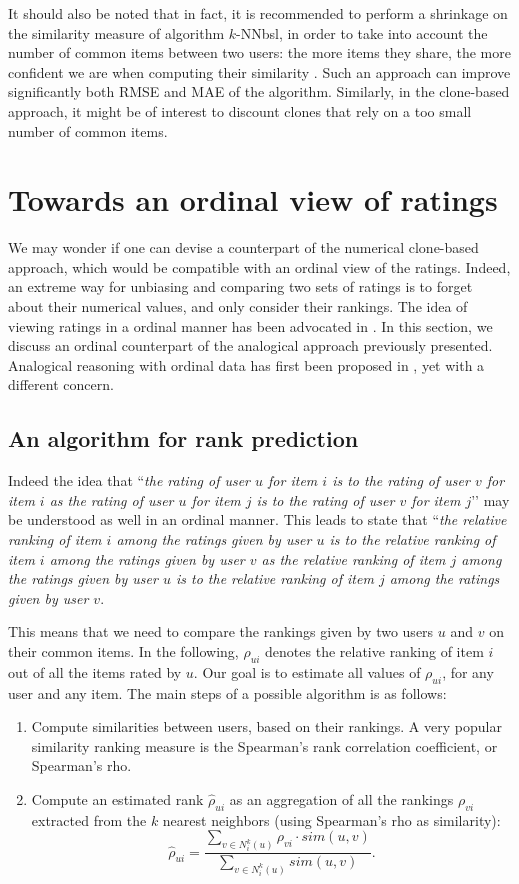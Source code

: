 \documentclass[conference]{IEEEtran}
\begin{document}
It should also be noted that in fact, it is recommended to perform a shrinkage
on the similarity measure of algorithm $k$-NNbsl, in order to take into account
the number of common items between two users: the more items they share, the
more confident we are when computing their similarity
\cite{Koren:2010:FNS:1644873.1644874}.
Such an approach can improve significantly both RMSE and MAE of the algorithm.
Similarly, in the clone-based approach, it might be of interest to discount
clones that rely on a too small number of common items.

\section{Towards an ordinal view of ratings}
\label{ORDINAL_POV}

We may wonder if one can devise a counterpart of the numerical clone-based approach, which would be compatible with an ordinal view of the ratings. Indeed, an extreme way for unbiasing and comparing two sets of ratings is to forget about their numerical values, and only consider their rankings.
The idea of viewing ratings in a ordinal manner has been advocated in
\cite{KorenOrdRec}.
In this section, we discuss an ordinal counterpart of the analogical approach previously presented.
Analogical reasoning with ordinal data has first been proposed in \cite{MicletBarbot09}, yet with a different concern.

\subsection{An algorithm for rank prediction}
Indeed the idea that ``\textit{the rating of user $u$ for item $i$ is to the
rating of user $v$ for item $i$ as the rating of user $u$ for item $j$ is to
the rating of user $v$ for item $j$}’’ may be understood  as well in an ordinal
manner. This leads to state that ``\textit{the relative ranking of item $i$
  among the ratings given by user $u$  is to the relative ranking of item $i$
  among the ratings given by user $v$ as the relative ranking of item $j$ among
  the ratings given by user $u$  is to the relative ranking of item $j$ among
the ratings given by user $v$}.

This means that we need to compare the rankings given by two users $u$ and $v$
on their common items. In the following, $\rho_{ui}$ denotes the relative
ranking of item $i$ out of all the items rated by $u$. Our goal is to estimate
all values of $\rho_{ui}$, for any user and any item. The main steps of a
possible algorithm is as follows:
\begin{enumerate}
  \item Compute similarities between users, based on their rankings. A very
    popular similarity ranking measure is the Spearman's rank correlation
    coefficient, or Spearman's rho.
  \item Compute an estimated rank $\hat{\rho}_{ui}$ as an aggregation of all the
    rankings $\rho_{vi}$ extracted from the $k$ nearest neighbors (using
    Spearman's rho as similarity):
    $$\hat{\rho}_{ui} = \frac{\sum_{v \in N_i^k(u)} \rho_{vi} \cdot
    sim(u, v)}{\sum_{v \in N_i^k(u)} sim(u, v)}.$$
\end{enumerate}
\end{document}
